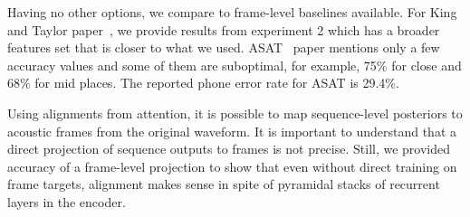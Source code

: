 \documentclass[a4paper]{article}
\begin{document}
Having no other options, we compare to frame-level baselines available. For King and Taylor paper~\cite{King-2000}, we provide results from experiment 2 which has a broader features set that is closer to what we used. ASAT~\cite{ASAT-2007} paper mentions only a few accuracy values and some of them are suboptimal, for example, 75\% for close and 68\% for mid places. The reported phone error rate for ASAT is 29.4\%.

Using alignments from attention, it is possible to map sequence-level posteriors to acoustic frames from the original waveform. It is important to understand that a direct projection of sequence outputs to frames is not precise. Still, we provided accuracy of a frame-level projection to show that even without direct training on frame targets, alignment makes sense in spite of pyramidal stacks of recurrent layers in the encoder.
\end{document}
